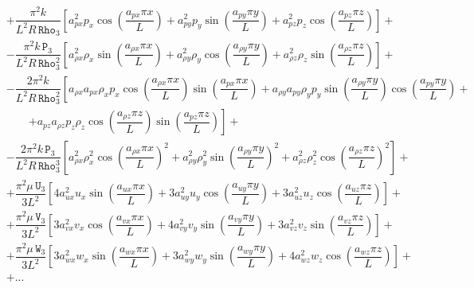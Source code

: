 \documentclass[10pt]{article}
\newcommand{\Rho}{\,\mathtt{Rho}}
\newcommand{\PP}{\,\mathtt{P}}
\newcommand{\U}{\,\mathtt{U}}
\newcommand{\V}{\,\mathtt{V}}
\newcommand{\W}{\,\mathtt{W}}
\begin{document}
\begin{equation}
\begin{split}
&+\dfrac{ \pi^2 k}{L^2 R \Rho_3}\left[a_{px}^2 p_x \cos\left(\dfrac{a_{px} \pi x}{L}\right)+a_{py}^2 p_y \sin\left(\dfrac{a_{py} \pi y}{L}\right)+a_{pz}^2 p_z \cos\left(\dfrac{a_{pz} \pi z}{L}\right)\right] +\\
&-\dfrac{ \pi^2 k \PP_3}{L^2 R \Rho_3^2}\left[a_{\rho x}^2 \rho_x \sin\left(\dfrac{a_{\rho x} \pi x}{L}\right)+a_{\rho y}^2 \rho_y \cos\left(\dfrac{a_{\rho y} \pi y}{L}\right)+a_{\rho z}^2 \rho_z \sin\left(\dfrac{a_{\rho z} \pi z}{L}\right)\right] +\\
&- \dfrac{2 \pi^2 k}{L^2 R \Rho_3^2}\left[a_{\rho x} a_{px} \rho_x p_x \cos\left(\dfrac{a_{\rho x} \pi x}{L}\right) \sin\left(\dfrac{a_{px} \pi x}{L}\right)+a_{\rho y} a_{py} \rho_y p_y \sin\left(\dfrac{a_{\rho y} \pi y}{L}\right) \cos\left(\dfrac{a_{py} \pi y}{L}\right)\right.+\\
    &\qquad\left.+a_{pz} a_{\rho z} p_z \rho_z \cos\left(\dfrac{a_{\rho z} \pi z}{L}\right) \sin\left(\dfrac{a_{pz} \pi z}{L}\right)\right] +\\
&-  \dfrac{2\pi^2 k \PP_3}{L^2 R \Rho_3^3}\left[a_{\rho x}^2 \rho_x^2 \cos\left(\dfrac{a_{\rho x} \pi x}{L}\right)^2+a_{\rho y}^2 \rho_y^2 \sin\left(\dfrac{a_{\rho y} \pi y}{L}\right)^2+a_{\rho z}^2 \rho_z^2 \cos\left(\dfrac{a_{\rho z} \pi z}{L}\right)^2\right] +\\
&+ \dfrac{ \pi^2 \mu \U_3 }{3L^2}\left[4 a_{ux}^2 u_x \sin\left(\dfrac{a_{ux} \pi x}{L}\right)+3 a_{uy}^2 u_y \cos\left(\dfrac{a_{uy} \pi y}{L}\right)+3 a_{uz}^2 u_z \cos\left(\dfrac{a_{uz} \pi z}{L}\right)\right]+\\
&+ \dfrac{\pi^2 \mu \V_3}{3L^2}\left[3 a_{vx}^2 v_x \cos\left(\dfrac{a_{vx} \pi x}{L}\right)+4 a_{vy}^2 v_y \sin\left(\dfrac{a_{vy} \pi y}{L}\right)+3 a_{vz}^2 v_z \sin\left(\dfrac{a_{vz} \pi z}{L}\right)\right]  +\\
&+\dfrac{\pi^2 \mu \W_3 }{3L^2}\left[3 a_{wx}^2 w_x \sin\left(\dfrac{a_{wx} \pi x}{L}\right)+3 a_{wy}^2 w_y \sin\left(\dfrac{a_{wy} \pi y}{L}\right)+4 a_{wz}^2 w_z \cos\left(\dfrac{a_{wz} \pi z}{L}\right)\right] +\\
&+...
 \end{split}
\end{equation}
\end{document}
